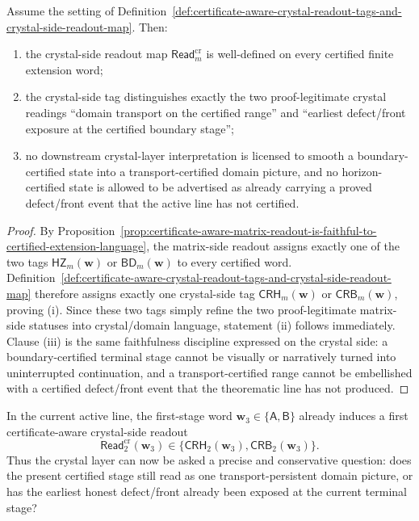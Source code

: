\begin{proposition}
\label{prop:certificate-aware-crystal-readout-is-faithful-to-the-matrix-side-horizon-boundary-tag}
Assume the setting of Definition~\ref{def:certificate-aware-crystal-readout-tags-and-crystal-side-readout-map}. Then:
\begin{enumerate}[label=(\roman*)]
  \item the crystal-side readout map \(\mathsf{Read}^{\mathrm{cr}}_{m}\) is well-defined on every certified finite extension word;
  \item the crystal-side tag distinguishes exactly the two proof-legitimate crystal readings ``domain transport on the certified range'' and ``earliest defect/front exposure at the certified boundary stage'';
  \item no downstream crystal-layer interpretation is licensed to smooth a boundary-certified state into a transport-certified domain picture, and no horizon-certified state is allowed to be advertised as already carrying a proved defect/front event that the active line has not certified.
\end{enumerate}
\end{proposition}

\begin{proof}
By Proposition~\ref{prop:certificate-aware-matrix-readout-is-faithful-to-certified-extension-language}, the matrix-side readout assigns exactly one of the two tags \(\mathsf{HZ}_{m}(\mathbf w)\) or \(\mathsf{BD}_{m}(\mathbf w)\) to every certified word. Definition~\ref{def:certificate-aware-crystal-readout-tags-and-crystal-side-readout-map} therefore assigns exactly one crystal-side tag \(\mathsf{CRH}_{m}(\mathbf w)\) or \(\mathsf{CRB}_{m}(\mathbf w)\), proving (i). Since these two tags simply refine the two proof-legitimate matrix-side statuses into crystal/domain language, statement (ii) follows immediately. Clause (iii) is the same faithfulness discipline expressed on the crystal side: a boundary-certified terminal stage cannot be visually or narratively turned into uninterrupted continuation, and a transport-certified range cannot be embellished with a certified defect/front event that the theorematic line has not produced.
\end{proof}

\begin{corollary}
\label{cor:present-sigma3-package-already-induces-first-certificate-aware-crystal-reading}
In the current active line, the first-stage word \(\mathbf w_3\in\{\mathsf A,\mathsf B\}\) already induces a first certificate-aware crystal-side readout
\[
  \mathsf{Read}^{\mathrm{cr}}_{2}(\mathbf w_3)
  \in
  \{\mathsf{CRH}_{2}(\mathbf w_3),\mathsf{CRB}_{2}(\mathbf w_3)\}.
\]
Thus the crystal layer can now be asked a precise and conservative question: does the present certified stage still read as one transport-persistent domain picture, or has the earliest honest defect/front already been exposed at the current terminal stage?
\end{corollary}

